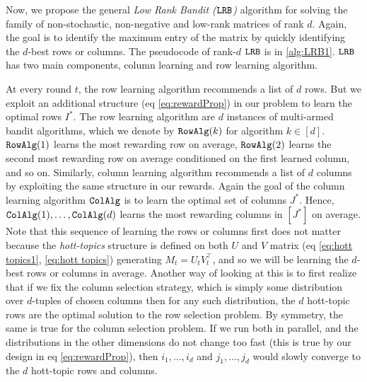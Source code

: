 
Now, we propose the general \emph{Low Rank Bandit (${\tt LRB}$)} algorithm for solving the family of non-stochastic, non-negative and low-rank matrices of rank $d$. Again, the goal is to identify the maximum entry of the matrix by quickly identifying the $d$-best rows or columns. The pseudocode of rank-$d$ ${\tt LRB}$ is in \cref{alg:LRB1}. ${\tt LRB}$ has two main components, column learning and row learning algorithm. 

At every round $t$, the row learning algorithm recommends a list of $d$ rows. But  we exploit an additional structure (eq \eqref{eq:rewardProp}) in our problem to learn the optimal rows $I^\ast$. The row learning algorithm are $d$ instances of multi-armed bandit algorithms, which we denote by ${\tt RowAlg}(k)$ for algorithm $k \in [d]$. ${\tt RowAlg}(1)$ learns the most rewarding row on average, ${\tt RowAlg}(2)$ learns the second most rewarding row on average conditioned on the first learned column, and so on.
Similarly, column learning algorithm recommends a list of $d$ columns by exploiting the same structure in our rewards. Again the goal of the column learning algorithm ${\tt ColAlg}$ is to learn the optimal set of columns $J^\ast$. Hence, ${\tt ColAlg}(1), \dots, {\tt ColAlg}(d)$ learns the most rewarding columns in $[J^*]$ on average. Note that this sequence of learning the rows or columns first does not matter because the \emph{hott-topics} structure is defined on both $U$ and $V$ matrix (eq \eqref{eq:hott topics1}, \eqref{eq:hott topics}) generating $M_t = U_t V_t^\intercal$, and so we will be learning the $d$-best rows or columns in average. Another way of looking at this is to first realize that if we fix the column selection strategy, which is simply some distribution over $d$-tuples of chosen columns then for any such distribution, the $d$ hott-topic rows are the optimal solution to the row selection problem. By symmetry, the same is true for the column selection problem. If we run both in parallel, and the distributions in the other dimensions do not change too fast (this is true by our design in eq \eqref{eq:rewardProp}), then $i_1, \dots, i_d$ and $j_1, \dots, j_d$ would slowly converge to the $d$ hott-topic rows and columns.

